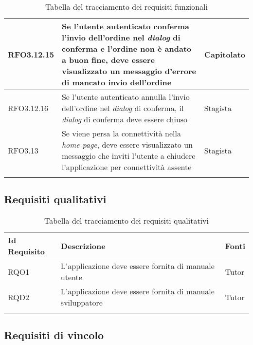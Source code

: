{\begin{center}
\begin{longtable}{ | >{\centering\arraybackslash}p{2.5cm} | >{\arraybackslash}p{7cm} | >{\centering\arraybackslash}p{2cm} | }
RFO3.12.15 & Se l'utente autenticato conferma l'invio dell'ordine nel \textit{dialog} di conferma e l'ordine non è andato a buon fine, deve essere visualizzato un messaggio d'errore di mancato invio dell'ordine & Capitolato \\ \hline
RFO3.12.16 & Se l'utente autenticato annulla l'invio dell'ordine nel \textit{dialog} di conferma, il \textit{dialog} di conferma deve essere chiuso & Stagista \\ \hline
RFO3.13 & Se viene persa la connettività nella \textit{home page}, deve essere visualizzato un messaggio che inviti l'utente a chiudere l'applicazione per connettività assente & Stagista \\
\hline
\caption{Tabella del tracciamento dei requisiti funzionali}
\end{longtable}
\end{center}}

\newpage

\subsection{Requisiti qualitativi}

{\renewcommand{\arraystretch}{2}
\begin{center}
\begin{longtable}{ | >{\centering\arraybackslash}p{2.5cm} | >{\arraybackslash}p{7cm} | >{\centering\arraybackslash}p{2cm} | }
\hline
\textbf{Id Requisito} & \textbf{Descrizione} & \textbf{Fonti} \\ \hline
\endhead
RQO1 & L'applicazione deve essere fornita di manuale utente & Tutor \\ \hline
RQD2 & L'applicazione deve essere fornita di manuale sviluppatore & Tutor \\ \hline
\caption{Tabella del tracciamento dei requisiti qualitativi}
\end{longtable}
\end{center}}

\newpage

\subsection{Requisiti di vincolo}


